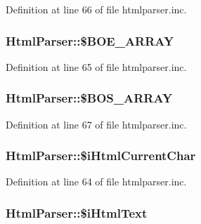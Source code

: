 Definition at line 66 of file htmlparser.\+inc.

\hypertarget{classHtmlParser_af0e54c2e2a1549ef2f4f3d120dd873aa}{
\subsubsection[{\$\+B\+O\+E\+\_\+\+A\+R\+R\+A\+Y}]{\setlength{\rightskip}{0pt plus 5cm}Html\+Parser\+::\$\+B\+O\+E\+\_\+\+A\+R\+R\+A\+Y}}\label{classHtmlParser_af0e54c2e2a1549ef2f4f3d120dd873aa}


Definition at line 65 of file htmlparser.\+inc.

\hypertarget{classHtmlParser_ab8dc07c0f07d5b0903ee4ed994a75431}{
\subsubsection[{\$\+B\+O\+S\+\_\+\+A\+R\+R\+A\+Y}]{\setlength{\rightskip}{0pt plus 5cm}Html\+Parser\+::\$\+B\+O\+S\+\_\+\+A\+R\+R\+A\+Y}}\label{classHtmlParser_ab8dc07c0f07d5b0903ee4ed994a75431}


Definition at line 67 of file htmlparser.\+inc.

\hypertarget{classHtmlParser_ac71cf9b7d83f1986b183f4224110d9e2}{
\subsubsection[{\$i\+Html\+Current\+Char}]{\setlength{\rightskip}{0pt plus 5cm}Html\+Parser\+::\$i\+Html\+Current\+Char}}\label{classHtmlParser_ac71cf9b7d83f1986b183f4224110d9e2}


Definition at line 64 of file htmlparser.\+inc.

\hypertarget{classHtmlParser_af6a1ecb77e687be07113d5a9ff9b9210}{
\subsubsection[{\$i\+Html\+Text}]{\setlength{\rightskip}{0pt plus 5cm}Html\+Parser\+::\$i\+Html\+Text}}\label{classHtmlParser_af6a1ecb77e687be07113d5a9ff9b9210}


